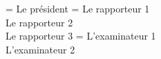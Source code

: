 \documentclass{thesul}
\begin{document}
\HdrUL
{}
\President    = {Le pr\'esident}
\Rapporteurs  = {Le rapporteur 1\\
                 Le rapporteur 2\\
                 Le rapporteur 3}
\Examinateurs = {L'examinateur 1\\
                 L'examinateur 2}

\MakeThesisTitlePage
\end{document}
